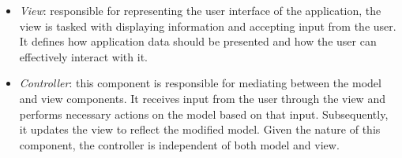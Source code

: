 \documentclass[../DD.tex]{subfiles}
\begin{document}
\begin{itemize}
{\begin{itemize}
{            The model is independent of the user interface, not concerned with how data is displayed nor how the user interacts with the application. 
            It directly manages the data, logic and rules of the application.}
            \item {\textit{View}: responsible for representing the user interface of the application, the view is tasked with displaying information and accepting input from the user. 
            It defines how application data should be presented and how the user can effectively interact with it.}
            \item {\textit{Controller}: this component is responsible for mediating between the model and view components. 
            It receives input from the user through the view and performs necessary actions on the model based on that input. 
            Subsequently, it updates the view to reflect the modified model. 
            Given the nature of this component, the controller is independent of both model and view.}
        \end{itemize}}
    \end{itemize}
\end{document}
